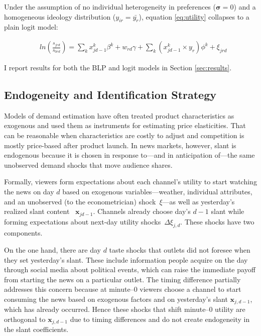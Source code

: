 \documentclass[12pt]{article}
\begin{document}
Under the assumption of no individual heterogeneity in preferences  ($\bm{\sigma}=0$) and a homogeneous ideology distribution ($y_{ir}= \bar{y_r}$),  equation \eqref{eq:utility} collapses to a plain logit model: 


\begin{equation}\label{eq:logit}
	\begin{aligned}
		& ln \left(\frac{s_{jrd}}{s_{0rd}}\right)= \sum_k x_{jd-1}^k\beta^k+w_{rd}   \gamma  +\sum_k \left(x_{jd-1}^k\times y_r \right) \phi^k +  \xi_{jrd}
	\end{aligned} 
\end{equation} 


I report results for both the BLP and  logit models in  Section \ref{sec:results}. 

\subsection{Endogeneity and Identification Strategy} \label{sec:endogeneity}
\label{sec:identification}


Models of demand estimation have often treated product characteristics as exogenous and used them as instruments for estimating price elasticities. That can be reasonable when characteristics are costly to adjust and competition is mostly price-based after product launch. In news markets, however, slant is endogenous because it is chosen in response to—and in anticipation of—the same unobserved demand shocks that move audience shares.





Formally, viewers form expectations about each channel’s utility to start watching the news on day $d$ based on exogenous variables—weather, individual attributes, and an unobserved (to the econometrician) shock~$\xi$—as well as yesterday’s  realized slant content ~$\bm{x}_{jd-1}$. Channels already choose day's $d-1$ slant while forming expectations about next-day utility shocks~$\Delta\xi_{j,d}$. These shocks have two components.


On the one hand, there are day $d$ taste shocks that outlets did not foresee when they set yesterday's slant.  These include information people acquire on the day through social media about political events, which can raise the immediate payoff from starting the news on a particular outlet. The timing difference partially addresses this concern because at minute–0 viewers choose a channel to start consuming the news based on exogenous factors and on yesterday’s slant $\bm{x}_{j,d-1}$, which has already occurred. Hence these shocks that shift minute–0 utility are orthogonal to $\bm{x}_{j,d-1}$ due to timing differences and do not create endogeneity in the slant coefficients.
\end{document}
